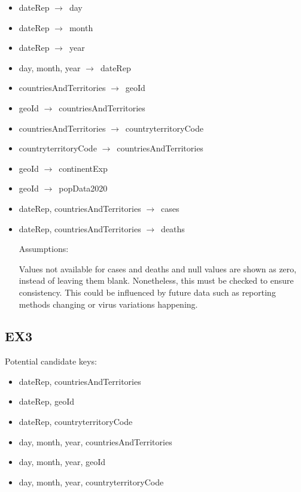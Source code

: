 \documentclass{article}
\begin{document}
\begin{itemize}

\item dateRep \(\rightarrow\)\ day

\item dateRep \(\rightarrow\)\ month

\item dateRep \(\rightarrow\)\ year

\item day, month, year \(\rightarrow\)\ dateRep

\item countriesAndTerritories \(\rightarrow\)\ geoId

\item geoId \(\rightarrow\)\ countriesAndTerritories

\item countriesAndTerritories \(\rightarrow\)\ countryterritoryCode

\item countryterritoryCode \(\rightarrow\)\ countriesAndTerritories

\item geoId \(\rightarrow\)\ continentExp

\item geoId \(\rightarrow\)\ popData2020

\item dateRep, countriesAndTerritories \(\rightarrow\)\ cases

\item dateRep, countriesAndTerritories \(\rightarrow\)\ deaths

Assumptions:

Values not available for cases and deaths and null values are shown as zero, instead of leaving them blank. Nonetheless, this must be checked to ensure consistency. This could be influenced by future data such as reporting methods changing or virus variations happening.

\end{itemize}

\subsection{EX3}

Potential candidate keys:

\begin{itemize}
    \item dateRep, countriesAndTerritories
    \item dateRep, geoId
    \item dateRep, countryterritoryCode
    \item day, month, year, countriesAndTerritories
    \item day, month, year, geoId
    \item day, month, year, countryterritoryCode
\end{itemize}
\end{document}

